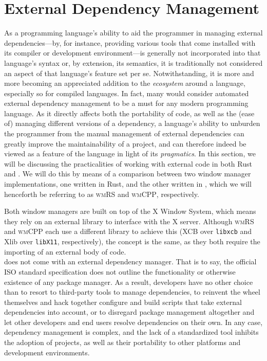 \section{External Dependency Management}

As a programming  language's ability to aid the programmer  in managing external
dependencies---by,  for instance,  providing various  tools that  come installed
with  its compiler  or development  environment---is generally  not incorporated
into that language's syntax or, by extension, its semantics, it is traditionally
not considered an aspect of that language's feature set per se. Notwithstanding,
it is more  and more becoming an appreciated addition  to the \textit{ecosystem}
around a  language, especially so  for compiled  languages. In fact,  many would
consider automated  external dependency management to  be a must for  any modern
programming language.  As it directly affects  both the portability of  code, as
well as the (ease of) managing  different versions of a dependency, a language's
ability  to unburden  the  programmer  from the  manual  management of  external
dependencies  can greatly  improve the  maintainability  of a  project, and  can
therefore  indeed be  viewed  as a  feature  of  the language  in  light of  its
\textit{pragmatics}. In this  section, we will be  discussing the practicalities
of working with external code in both Rust and \cpp. We will do this by means of
a comparison  between two window  manager implementations, one written  in Rust,
and the  other written  in \cpp,  which we  will henceforth  be referring  to as
\textsc{wmRS} and \textsc{wmCPP}, respectively.

Both  window managers  are built  on top  of the  X Window  System, which  means
they  rely on  an external  library  to interface  with the  X server.  Although
\textsc{wmRS} and  \textsc{wmCPP} each use  a different library to  achieve this
(XCB  over \texttt{libxcb}  and  Xlib over  \texttt{libX11}, respectively),  the
concept is the same,  as they both require the importing of  an external body of
code.\\

\cpp does  not come  with an external  dependency manager. That  is to  say, the
official  ISO  standard \cpp  specification\cite{cppstd}  does  not outline  the
functionality  or otherwise  existence  of  any package  manager.  As a  result,
developers have  no other choice than  to resort to third-party  tools to manage
dependencies, to reinvent  the wheel themselves and hack  together configure and
build  scripts that  take external  dependencies into  account, or  to disregard
package management  altogether and  let other developers  and end  users resolve
dependencies on their  own. In any case, \cpp dependency  management is complex,
and the lack of  a standardized tool inhibits the adoption  of \cpp projects, as
well as their portability to other platforms and development environments.

